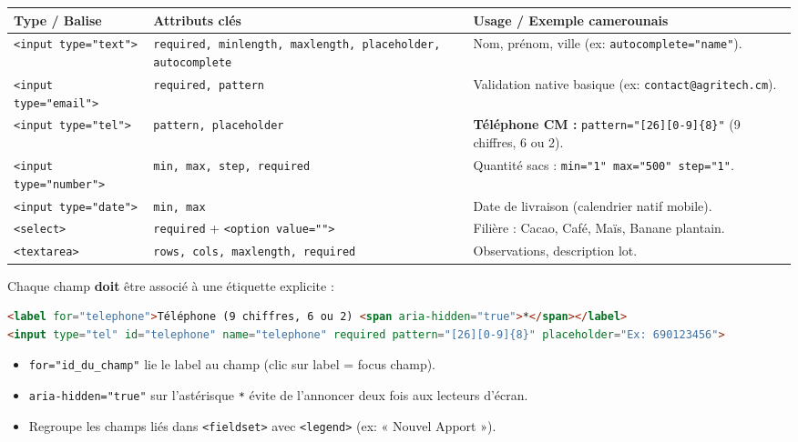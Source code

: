\documentclass[11pt]{article}
\begin{document}
\begin{propriete}
\begin{center}
\begin{tabularx}{\linewidth}{|l|l|X|}\hline
\textbf{Type / Balise} & \textbf{Attributs clés} & \textbf{Usage / Exemple camerounais} \\\hline
\texttt{<input type="text">} & \texttt{required, minlength, maxlength, placeholder, autocomplete} & Nom, prénom, ville (ex: \texttt{autocomplete="name"}). \\\hline
\texttt{<input type="email">} & \texttt{required, pattern} & Validation native basique (ex: \texttt{contact@agritech.cm}). \\\hline
\texttt{<input type="tel">} & \texttt{pattern, placeholder} & \textbf{Téléphone CM :} \texttt{pattern="[26][0-9]\{8\}"} (9 chiffres, 6 ou 2). \\\hline
\texttt{<input type="number">} & \texttt{min, max, step, required} & Quantité sacs : \texttt{min="1" max="500" step="1"}. \\\hline
\texttt{<input type="date">} & \texttt{min, max} & Date de livraison (calendrier natif mobile). \\\hline
\texttt{<select>} & \texttt{required} + \texttt{<option value="">} & Filière : Cacao, Café, Maïs, Banane plantain. \\\hline
\texttt{<textarea>} & \texttt{rows, cols, maxlength, required} & Observations, description lot. \\\hline
\end{tabularx}
\end{center}
\end{propriete}

\begin{propriete}
Chaque champ \textbf{doit} être associé à une étiquette explicite :
\begin{lstlisting}[language=HTML]
<label for="telephone">Téléphone (9 chiffres, 6 ou 2) <span aria-hidden="true">*</span></label>
<input type="tel" id="telephone" name="telephone" required pattern="[26][0-9]{8}" placeholder="Ex: 690123456">
\end{lstlisting}
\begin{itemize}
    \item \texttt{for="id\_du\_champ"} lie le label au champ (clic sur label = focus champ).
    \item \texttt{aria-hidden="true"} sur l'astérisque \texttt{*} évite de l'annoncer deux fois aux lecteurs d'écran.
    \item Regroupe les champs liés dans \texttt{<fieldset>} avec \texttt{<legend>} (ex: « Nouvel Apport »).
\end{itemize}
\end{propriete}
\end{document}
